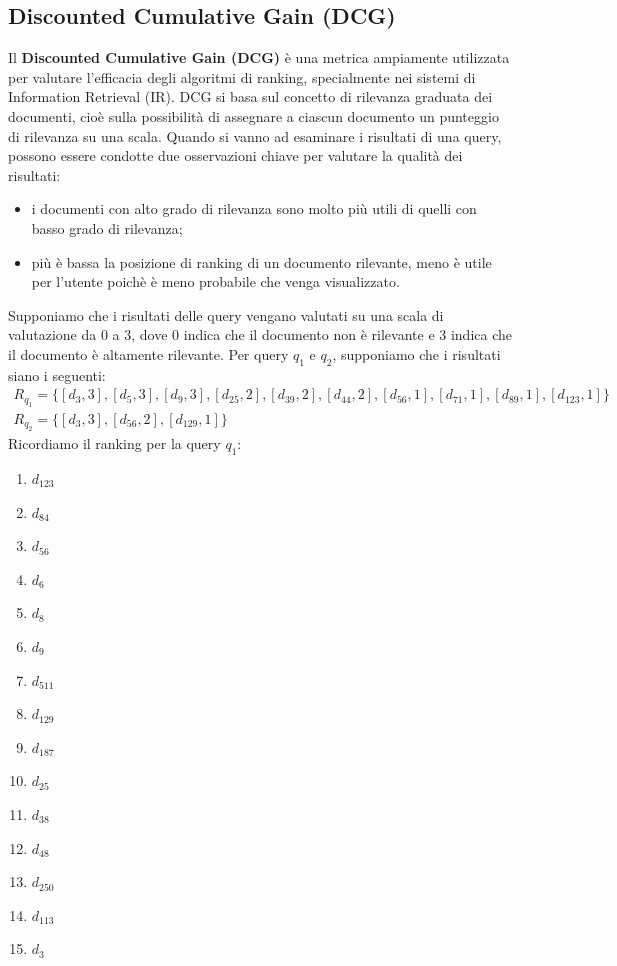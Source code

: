 \documentclass{report}
\begin{document}
	\subsection{Discounted Cumulative Gain (DCG)}
	Il \textbf{Discounted Cumulative Gain (DCG)} è una metrica ampiamente utilizzata per valutare l'efficacia degli algoritmi di ranking, specialmente nei sistemi di Information Retrieval (IR). DCG si basa sul concetto di rilevanza graduata dei documenti, cioè sulla possibilità di assegnare a ciascun documento un punteggio di rilevanza su una scala. Quando si vanno ad esaminare i risultati di una query, possono essere condotte due osservazioni chiave per valutare la qualità dei risultati:
	\begin{itemize}
		\item i documenti con alto grado di rilevanza sono molto più utili di quelli con basso grado di rilevanza;
		\item più è bassa la posizione di ranking di un documento rilevante, meno è utile per l'utente poichè è meno probabile che venga visualizzato.
	\end{itemize}
	Supponiamo che i risultati delle query vengano valutati su una scala di valutazione da 0 a 3, dove 0 indica che il documento non è rilevante e 3 indica che il documento è altamente rilevante. Per query $q_1$ e $q_2$, supponiamo che i risultati siano i seguenti:
	\[
		\begin{array}{l}
			R_{q_1} = \{[d_3, 3], [d_5, 3], [d_9, 3], [d_{25}, 2], [d_{39}, 2], [d_{44}, 2], [d_{56}, 1], [d_{71}, 1], [d_{89}, 1], [d_{123},1]\}\\
			R_{q_2} = \{[d_3, 3], [d_{56}, 2], [d_{129}, 1]\}
		\end{array}
	\]
	Ricordiamo il ranking per la query $q_1$:
	\begin{multicols}{3}
		\begin{enumerate}
			\item $d_{123}$
			\item $d_{84}$
			\item $d_{56}$
			\item $d_{6}$
			\item $d_{8}$
			\item $d_{9}$
			\item $d_{511}$
			\item $d_{129}$
			\item $d_{187}$
			\item $d_{25}$
			\item $d_{38}$
			\item $d_{48}$
			\item $d_{250}$
			\item $d_{113}$
			\item $d_{3}$
		\end{enumerate}
	\end{multicols}
\end{document}
